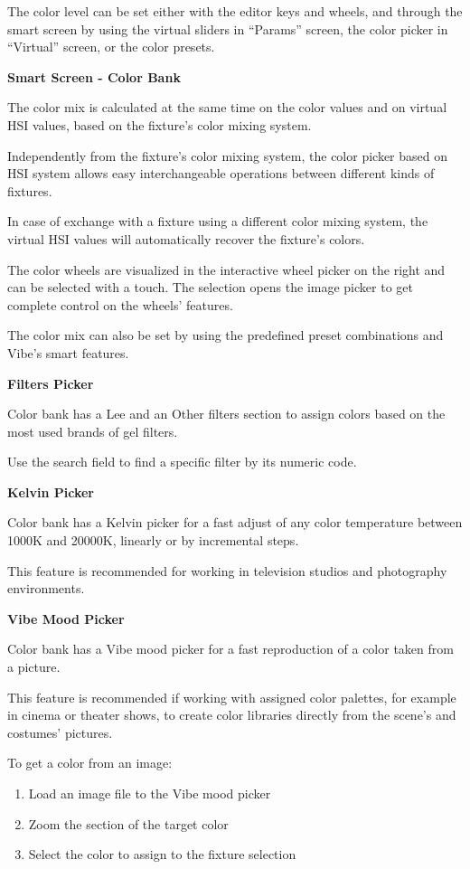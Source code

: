 \documentclass[
]{article}
\begin{document}
The color level can be set either with the editor keys and wheels, and through the smart screen by using the virtual sliders in ``Params'' screen, the color picker in ``Virtual'' screen, or the color presets.

\textbf{Smart Screen - Color Bank}

The color mix is calculated at the same time on the color values and on virtual HSI values, based on the fixture's color mixing system.

Independently from the fixture's color mixing system, the color picker based on HSI system allows easy interchangeable operations between different kinds of fixtures.

In case of exchange with a fixture using a different color mixing system, the virtual HSI values will automatically recover the fixture's colors.

The color wheels are visualized in the interactive wheel picker on the right and can be selected with a touch. The selection opens the image picker to get complete control on the wheels' features.

The color mix can also be set by using the predefined preset combinations and Vibe's smart features.

\textbf{Filters Picker}

Color bank has a Lee and an Other filters section to assign colors based on the most used brands of gel filters.

Use the search field to find a specific filter by its numeric code.

\textbf{Kelvin Picker}

Color bank has a Kelvin picker for a fast adjust of any color temperature between 1000K and 20000K, linearly or by incremental steps.

This feature is recommended for working in television studios and photography environments.

\textbf{Vibe Mood Picker}

Color bank has a Vibe mood picker for a fast reproduction of a color taken from a picture.

This feature is recommended if working with assigned color palettes, for example in cinema or theater shows, to create color libraries directly from the scene's and costumes' pictures.

To get a color from an image:

\begin{enumerate}
\def\labelenumi{\arabic{enumi}.}
\item
  Load an image file to the Vibe mood picker
\item
  Zoom the section of the target color
\item
  Select the color to assign to the fixture selection
\end{enumerate}
\end{document}
